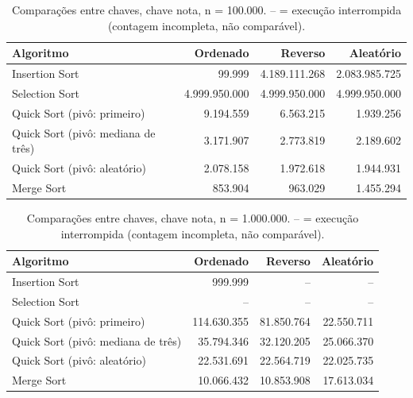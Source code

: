 \begin{table}[ht]
\centering
\caption{Compara\c{c}\~oes entre chaves, chave nota, n = 100.000. -- = execu\c{c}\~ao interrompida (contagem incompleta, n\~ao compar\'avel).}
\label{tab:comp-nota-100000}
\begin{tabular}{lrrr}
\hline
Algoritmo & Ordenado & Reverso & Aleat\'orio \\
\hline
Insertion Sort & 99.999 & 4.189.111.268 & 2.083.985.725 \\
Selection Sort & 4.999.950.000 & 4.999.950.000 & 4.999.950.000 \\
Quick Sort (piv\^o: primeiro) & 9.194.559 & 6.563.215 & 1.939.256 \\
Quick Sort (piv\^o: mediana de tr\^es) & 3.171.907 & 2.773.819 & 2.189.602 \\
Quick Sort (piv\^o: aleat\'orio) & 2.078.158 & 1.972.618 & 1.944.931 \\
Merge Sort & 853.904 & 963.029 & 1.455.294 \\
\hline
\end{tabular}
\end{table}

\begin{table}[ht]
\centering
\caption{Compara\c{c}\~oes entre chaves, chave nota, n = 1.000.000. -- = execu\c{c}\~ao interrompida (contagem incompleta, n\~ao compar\'avel).}
\label{tab:comp-nota-1000000}
\begin{tabular}{lrrr}
\hline
Algoritmo & Ordenado & Reverso & Aleat\'orio \\
\hline
Insertion Sort & 999.999 & -- & -- \\
Selection Sort & -- & -- & -- \\
Quick Sort (piv\^o: primeiro) & 114.630.355 & 81.850.764 & 22.550.711 \\
Quick Sort (piv\^o: mediana de tr\^es) & 35.794.346 & 32.120.205 & 25.066.370 \\
Quick Sort (piv\^o: aleat\'orio) & 22.531.691 & 22.564.719 & 22.025.735 \\
Merge Sort & 10.066.432 & 10.853.908 & 17.613.034 \\
\hline
\end{tabular}
\end{table}
